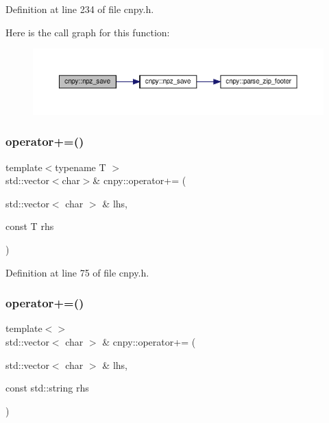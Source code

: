 Definition at line 234 of file cnpy.\+h.

Here is the call graph for this function\+:
\nopagebreak
\begin{figure}[H]
\begin{center}
\leavevmode
\includegraphics[width=350pt]{namespacecnpy_a7161744ba1c204fea5c5e15b177a311f_cgraph}
\end{center}
\end{figure}
\mbox{\label{namespacecnpy_ac8daa2ff90ad9f02b13e8a6f6b88bca6}} 
\subsubsection{\texorpdfstring{operator+=()}{operator+=()}\hspace{0.1cm}{\footnotesize\ttfamily [1/3]}}
{\footnotesize\ttfamily template$<$typename T $>$ \\
std\+::vector$<$char$>$\& cnpy\+::operator+= (\begin{DoxyParamCaption}\item[{std\+::vector$<$ char $>$ \&}]{lhs,  }\item[{const T}]{rhs }\end{DoxyParamCaption})}



Definition at line 75 of file cnpy.\+h.

\mbox{\label{namespacecnpy_a357cd39fe2f4327eb08495b48544d47e}} 
\subsubsection{\texorpdfstring{operator+=()}{operator+=()}\hspace{0.1cm}{\footnotesize\ttfamily [2/3]}}
{\footnotesize\ttfamily template$<$$>$ \\
std\+::vector$<$ char $>$ \& cnpy\+::operator+= (\begin{DoxyParamCaption}\item[{std\+::vector$<$ char $>$ \&}]{lhs,  }\item[{const std\+::string}]{rhs }\end{DoxyParamCaption})}



